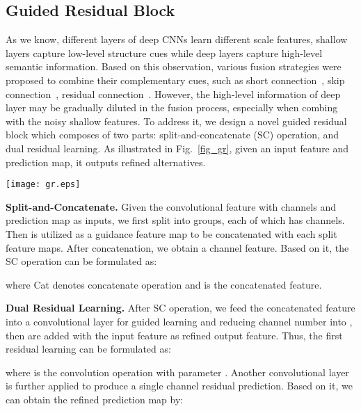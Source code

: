 \documentclass[runningheads]{llncs}
\begin{document}
\subsection{Guided Residual Block}
As we know, different layers of deep CNNs learn different scale features, shallow layers capture low-level structure cues while deep layers capture high-level semantic information. Based on this observation, various fusion strategies were proposed to combine their complementary cues, such as short connection~\cite{hou2019deeply}, skip connection~\cite{lin2017feature}, residual connection~\cite{he2016deep}\cite{deng2018r3net}\cite{zhang2020residual}. However, the high-level information of deep layer may be gradually diluted in the fusion process, especially when combing with the noisy shallow features. To address it, we design a novel guided residual block which composes of two parts: split-and-concatenate (SC) operation, and dual residual learning. As illustrated in Fig.~\ref{fig_gr}, given an input feature and prediction map, it outputs refined alternatives.

\begin{figure*}  
  \centering  
  \texttt{[image: gr.eps]}
  \caption{The proposed guided residual blocks (dashed bounding boxes on the left), which are stacked with progressive guidance. SC denotes split-and-concatenate operation (dashed bounding box on the right).}  
  \label{fig_gr}  
\end{figure*}

\textbf{Split-and-Concatenate.} Given the convolutional feature  with  channels and prediction map  as inputs, we first split  into  groups, each of which has  channels. Then  is utilized as a guidance feature map to be concatenated with each split feature maps. After concatenation, we obtain a  channel feature. Based on it, the SC operation can be formulated as:




where Cat denotes concatenate operation and  is the concatenated feature.

\textbf{Dual Residual Learning.} After SC operation, we feed the concatenated feature  into a  convolutional layer for guided learning and reducing channel number into , then are added with the input feature as refined output feature. Thus, the first residual learning can be formulated as:


where  is the convolution operation with parameter . Another  convolutional layer is further applied to produce a single channel residual prediction. Based on it, we can obtain the refined prediction map  by:
\end{document}
